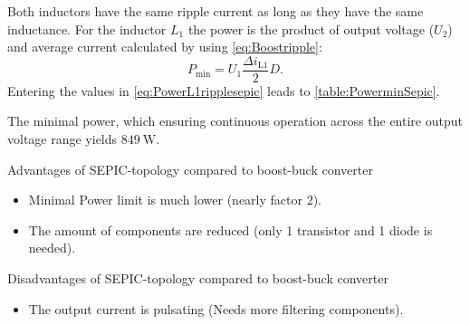 

\begin{solutionblock}
    Both inductors have the same ripple current as long as they have the same inductance.
    For the inductor $L_1$ the power is the product of output voltage
     ($U_\mathrm{2}$) and average current calculated by using \eqref{eq:Boostripple}:
    \begin{equation}
        P_\mathrm{min}=U_\mathrm{1}\frac{\Delta i_\mathrm{L1}}{2}D.
        \label{eq:PowerL1ripplesepic}
    \end{equation}
    Entering the values in \eqref{eq:PowerL1ripplesepic} leads to \autoref{table:PowerminSepic}.
    
    The minimal power, which ensuring continuous operation across the entire output voltage range
    yields  $\SI{849}{\watt}$.

\end{solutionblock}



\begin{solutionblock}
    Advantages of SEPIC-topology compared to boost-buck converter
    \begin{itemize}
        \item Minimal Power limit is much lower (nearly factor 2).
        \item The amount of components are reduced (only 1 transistor and 1 diode is needed).
    \end{itemize}  
    Disadvantages of SEPIC-topology compared to boost-buck converter
    \begin{itemize}
        \item The output current is pulsating (Needs more filtering components).
    \end{itemize}  
\end{solutionblock}
